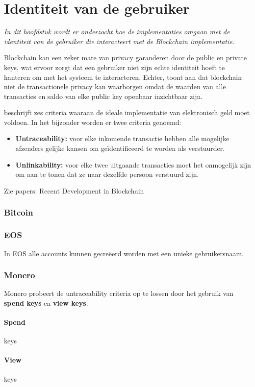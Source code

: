 \section{Identiteit van de gebruiker}
\textit{In dit hoofdstuk wordt er onderzocht hoe de implementaties omgaan met de identiteit van de gebruiker die interacteert met de Blockchain implementatie.}

Blockchain kan een zeker mate van privacy garanderen door de public en private keys, wat ervoor zorgt dat een gebruiker niet zijn echte identiteit hoeft te hanteren om met het systeem te interacteren. Echter, \cite{meiklejohn2013fistful} toont aan dat blockchain niet de transactionele privacy kan waarborgen omdat de waarden van alle transacties en saldo van elke public key openbaar inzichtbaar zijn.

\citet{Okamoto:1991:UEC:646756.705374} beschrijft zes criteria waaraan de ideale implementatie van elektronisch geld moet voldoen. In het bijzonder worden er twee criteria genoemd:

\begin{itemize}
  \item \textbf{Untraceability:} voor elke inkomende transactie hebben alle mogelijke afzenders gelijke kansen om geïdentificeerd te worden als verstuurder. 
  
  \item \textbf{Unlinkability:} voor elke twee uitgaande transacties moet het onmogelijk zijn om aan te tonen dat ze naar dezelfde persoon verstuurd zijn.
\end{itemize}

Zie papers: Recent Development in Blockchain

\subsubsection{Bitcoin}


\subsubsection{EOS}

In EOS alle accounts kunnen gecreëerd worden met een unieke gebruikersnaam.

\subsubsection{Monero}

Monero probeert de untraceability criteria op te lossen door het gebruik van \textbf{spend keys} en \textbf{view keys}.

\paragraph{Spend} keys 

\paragraph{View} keys